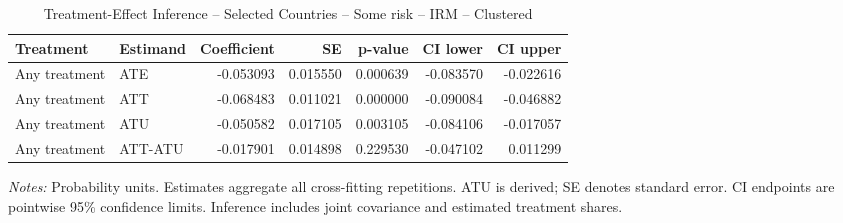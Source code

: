 \begin{table}[htbp]
\centering
\caption{Treatment-Effect Inference -- Selected Countries -- Some risk -- IRM -- Clustered}
\label{tab:inference-SomeRiskHome-IRM-clustered-selected-countries}
\scriptsize
\begin{adjustbox}{max width=\linewidth}
\begin{tabular}{llrrrrr}
\toprule
Treatment & Estimand & Coefficient & SE & p-value & CI lower & CI upper \\
\midrule
Any treatment & ATE & -0.053093 & 0.015550 & 0.000639 & -0.083570 & -0.022616 \\
Any treatment & ATT & -0.068483 & 0.011021 & 0.000000 & -0.090084 & -0.046882 \\
Any treatment & ATU & -0.050582 & 0.017105 & 0.003105 & -0.084106 & -0.017057 \\
Any treatment & ATT-ATU & -0.017901 & 0.014898 & 0.229530 & -0.047102 & 0.011299 \\
\bottomrule
\end{tabular}

\end{adjustbox}
\par\smallskip
\begin{minipage}{\linewidth}\scriptsize \textit{Notes:} Probability units. Estimates aggregate all cross-fitting repetitions. ATU is derived; SE denotes standard error. CI endpoints are pointwise 95\% confidence limits. Inference includes joint covariance and estimated treatment shares. \end{minipage}
\end{table}

